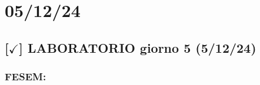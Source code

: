 \section{05/12/24}

\subsection{[$\checkmark$] LABORATORIO giorno 5 (5/12/24)}

\subsubsection{FESEM: }